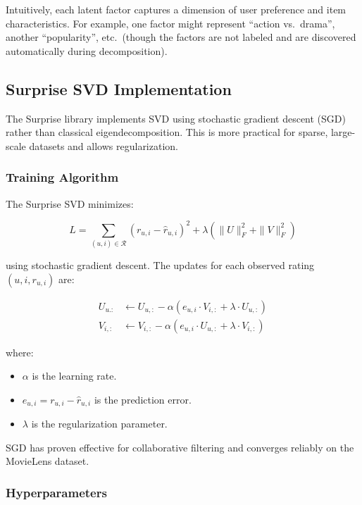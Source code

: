 Intuitively, each latent factor captures a dimension of user preference and item characteristics. 
For example, one factor might represent ``action vs.~drama'', another ``popularity'', etc.~(though 
the factors are not labeled and are discovered automatically during decomposition).

\subsection{Surprise SVD Implementation}

The Surprise library implements SVD using stochastic gradient descent (SGD) rather than classical 
eigendecomposition. This is more practical for sparse, large-scale datasets and allows regularization.

\subsubsection{Training Algorithm}

The Surprise SVD minimizes:

\[
  L = \sum_{(u,i) \in \mathcal{R}} (r_{u,i} - \hat{r}_{u,i})^2 + \lambda \left(\|U\|_F^2 + \|V\|_F^2\right)
\]

using stochastic gradient descent. The updates for each observed rating $(u, i, r_{u,i})$ are:

\begin{align}
  U_{u.:} &\leftarrow U_{u,:} - \alpha \left(e_{u,i} \cdot V_{i,:} + \lambda \cdot U_{u,:}\right) \\
  V_{i,:} &\leftarrow V_{i,:} - \alpha \left(e_{u,i} \cdot U_{u,:} + \lambda \cdot V_{i,:}\right)
\end{align}

where:
\begin{itemize}
  \item $\alpha$ is the learning rate.
  \item $e_{u,i} = r_{u,i} - \hat{r}_{u,i}$ is the prediction error.
  \item $\lambda$ is the regularization parameter.
\end{itemize}

SGD has proven effective for collaborative filtering and converges reliably on the MovieLens dataset.

\subsubsection{Hyperparameters}

